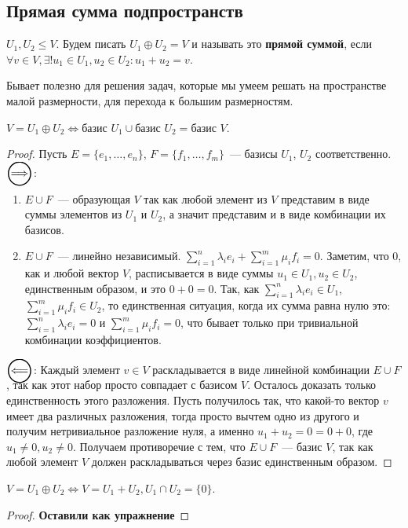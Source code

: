 \subsection{Прямая сумма подпространств}
\begin{definition} 
    $U_1, U_2\le V$. Будем писать $U_1 \oplus U_2 = V$ и называть это \textbf{прямой суммой}, если
    $\forall v\in V, \exists! u_1\in U_1, u_2\in U_2\colon u_1 + u_2 = v$.
\end{definition}
\begin{motivation}
    Бывает полезно для решения задач, которые мы умеем решать на пространстве малой размерности, для
    перехода к большим размерностям.
\end{motivation}
\begin{statement}
    $V = U_1\oplus U_2\Leftrightarrow \text{базис } U_1 \cup \text{базис } U_2 = \text{базис } V$.
\end{statement}
\begin{proof}
    Пусть $E = \{e_1,\dots, e_n\}$, $F = \{f_1,\dots,f_m\}$~--- базисы $U_1$, $U_2$ соответственно.
    $\ora$:
        \begin{enumerate}
            \item $E\cup F$~--- образующая $V$ так как любой элемент из $V$ представим в виде суммы элементов
                из $U_1$ и $U_2$, а значит представим и в виде комбинации их базисов.
            \item $E\cup F$~--- линейно независимый. 
                $\sum\limits_{i=1}^{n} \lambda_ie_i + \sum\limits_{i=1}^{m} \mu_if_i = 0$. 
                Заметим, что $0$, как и любой вектор $V$, расписывается в виде суммы $u_1\in U_1, u_2\in U_2$,
                единственным образом, и это $0 + 0 = 0$. Так, как
                $\sum\limits_{i=1}^{n} \lambda_ie_i \in U_1$, $\sum\limits_{i=1}^{m} \mu_if_i \in U_2$,
                то единственная ситуация, когда их сумма равна нулю это:
                $\sum\limits_{i=1}^{n} \lambda_ie_i = 0$ и $\sum\limits_{i=1}^{m} \mu_if_i = 0$,
                что бывает только при тривиальной комбинации коэффициентов.
        \end{enumerate}
    $\ola$:
        Каждый элемент $v\in V$ раскладывается в виде линейной комбинации $E\cup F$, так как этот набор
        просто совпадает с базисом $V$. Осталось доказать только единственность этого разложения. 
        Пусть получилось так, что какой-то вектор $v$ имеет два различных разложения, тогда просто вычтем 
        одно из другого и получим нетривиальное разложение нуля, а именно $u_1 + u_2 = 0 = 0 + 0$, где
        $u_1\not=0, u_2\not=0$. Получаем противоречие с тем, что $E\cup F$~--- базис $V$, так как любой
        элемент $V$ должен раскладываться через базис единственным образом.
\end{proof}
\begin{remark}
    $V = U_1\oplus U_2 \Leftrightarrow V = U_1 + U_2,  U_1 \cap U_2 = \{0\}$. 
\end{remark}
\begin{proof}
    \textbf{Оставили как упражнение}
\end{proof}
